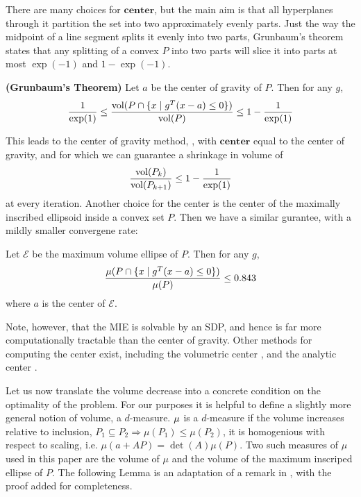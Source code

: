 There are many choices for $\mathbf{center}$, but the main aim is that all
hyperplanes through it partition the set into two approximately
evenly parts. Just the way the midpoint of a line segment
splits it evenly into two parts, Grunbaum's theorem states that
any splitting of a convex $P$ into two parts will slice it into parts
at most $\exp(-1)$ and $1- \exp(-1)$.

\begin{thm} {\bf (Grunbaum's Theorem)} \label{thm:CG_cut} 
Let $a$ be the center of gravity of $P$. Then for any $g$,
$$
 \frac{1}{\exp(1)} \leq \frac{\textnormal{vol}(P \cap \{ x \mid g^T(x - a)\leq 0\}) }{\textnormal{vol}(P)} \leq 1- \frac{1}{\exp(1)} 
$$
\end{thm}



This leads to the center of gravity method,
\cite{levin1965algorithm,newman1965location}, with $\mathbf{center}$
equal to the center of gravity, and for which we can guarantee a shrinkage
in volume of 
$$\frac{\textnormal{vol}(P_k)}{\textnormal{vol}(P_{k+1})} \leq 1 - \frac{1}{\exp(1)} $$ 
at every iteration. Another choice for the center is the center of the
maximally inscribed ellipsoid inside a convex set $P$. Then we have a
similar gurantee, with a mildly smaller convergene rate:

\begin{thm} \label{thm:MIE_cut} \cite{tarasov1988method} 
Let $\mathcal{E}$ be the maximum volume ellipse of $P$. Then for any $g$,
$$
\frac{\mu(P \cap \{ x \mid g^T(x - a)\leq 0\}) }{\mu(P)} \leq 0.843  
$$
where $a$ is the center of $\mathcal{E}$.
\end{thm}

Note, however, that the MIE is solvable by an SDP, and hence is far
more computationally tractable than the center of gravity. Other 
methods for computing the center exist, including  the volumetric center
\cite{vaidya1989new}, and the analytic center \cite{ye1996complexity}.

Let us now translate the volume decrease into a concrete condition on
the optimality of the problem. For our purposes
it is helpful to define a slightly more general notion of volume, a
$d$-measure. $\mu$ is a $d$-measure if the volume increases relative to
inclusion, $P_1 \subseteq P_2 \Rightarrow \mu(P_1) \leq \mu(P_2)$, it is
homogenious with respect to scaling, i.e. $\mu(a+AP)=\det(A)\mu(P)$. Two such
measures of $\mu$ used in this paper are the volume of $\mu$ and the volume of
the maximum inscriped ellipse of $P$. The following Lemma is an adaptation of
a remark in \cite{tarasov1988method}, with the proof added for completeness.

